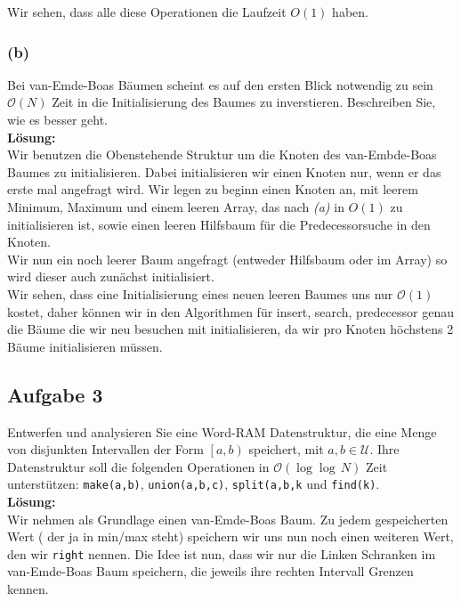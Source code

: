 \documentclass[11pt,a4paper,ngerman]{article}
\begin{document}
Wir sehen, dass alle diese Operationen die Laufzeit $O(1)$ haben.
\subsubsection*{(b)}

Bei van-Emde-Boas  Bäumen scheint es auf den ersten Blick notwendig zu sein $\mathcal{O}(N)$ Zeit in die Initialisierung des Baumes zu inverstieren. Beschreiben Sie, wie es besser geht.\\

\noindent\textbf{Lösung:}\\

Wir benutzen die Obenstehende Struktur um die Knoten des van-Embde-Boas Baumes zu initialisieren. Dabei initialisieren wir einen Knoten nur,
wenn er das erste mal angefragt wird. Wir legen zu beginn einen Knoten an, mit leerem Minimum, Maximum und einem leeren Array,
das nach \emph{(a)} in $O(1)$ zu initialisieren ist, sowie einen leeren Hilfsbaum für die Predecessorsuche in den Knoten.\\

Wir nun ein noch leerer Baum angefragt (entweder Hilfsbaum oder im Array) so wird dieser auch zunächst initialisiert.\\

Wir sehen, dass eine Initialisierung eines neuen leeren Baumes uns nur $\mathcal{O}(1)$ kostet, daher können wir in den Algorithmen für insert, search, predecessor genau die Bäume die wir neu besuchen mit initialisieren, da wir pro Knoten höchstens 2 Bäume initialisieren müssen.

\subsection*{Aufgabe 3}

Entwerfen und analysieren Sie eine Word-RAM Datenstruktur, die eine Menge von disjunkten Intervallen der Form $\left[a,b\right)$ speichert, mit $a,b \in \mathcal{U}$. Ihre Datenstruktur soll die folgenden Operationen in $\mathcal{O}(\log\log \, N)$ Zeit unterstützen: \lstinline|make(a,b)|, \lstinline|union(a,b,c)|, \lstinline|split(a,b,k| und \lstinline|find(k)|.\\

\noindent\textbf{Lösung:}\\

Wir nehmen als Grundlage einen van-Emde-Boas Baum. Zu jedem gespeicherten Wert ( der ja in min/max steht) speichern wir uns nun noch einen weiteren Wert, den wir \lstinline|right| nennen. Die Idee ist nun, dass wir nur die Linken Schranken im van-Emde-Boas Baum speichern, die jeweils ihre rechten Intervall Grenzen kennen.\\
\end{document}
